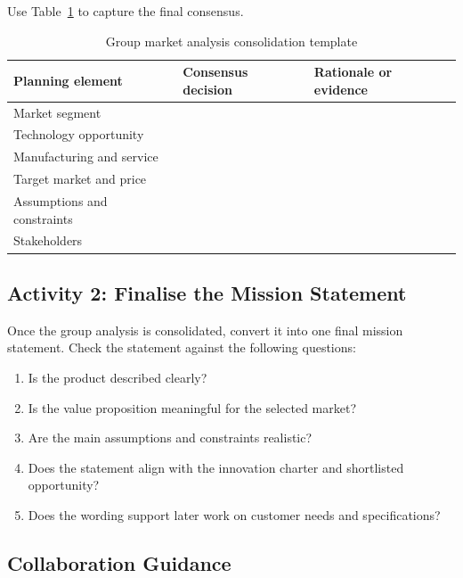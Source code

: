 Use Table~\ref{tab:session56-group-consolidation} to capture the final consensus.

\begin{table}[htbp]
\centering
\caption{Group market analysis consolidation template}
\label{tab:session56-group-consolidation}
\renewcommand{\arraystretch}{1.2}
\begin{tabularx}{\textwidth}{|>{\raggedright\arraybackslash}p{}|>{\raggedright\arraybackslash}X|>{\raggedright\arraybackslash}p{}|}
\hline
\textbf{Planning element} & \textbf{Consensus decision} & \textbf{Rationale or evidence} \\
\hline
Market segment &  &  \\
\hline
Technology opportunity &  &  \\
\hline
Manufacturing and service &  &  \\
\hline
Target market and price &  &  \\
\hline
Assumptions and constraints &  &  \\
\hline
Stakeholders &  &  \\
\hline
\end{tabularx}
\end{table}

\subsection{Activity 2: Finalise the Mission Statement}

Once the group analysis is consolidated, convert it into one final mission statement. Check the statement against the following questions:
\begin{enumerate}
    \item Is the product described clearly?
    \item Is the value proposition meaningful for the selected market?
    \item Are the main assumptions and constraints realistic?
    \item Does the statement align with the innovation charter and shortlisted opportunity?
    \item Does the wording support later work on customer needs and specifications?
\end{enumerate}

\subsection{Collaboration Guidance}

